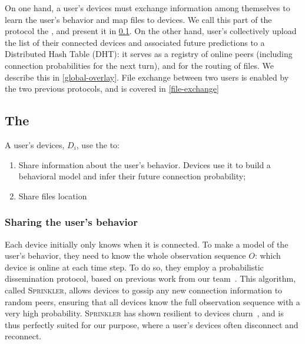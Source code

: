 On one hand, a user's devices must exchange information among themselves to learn the user's behavior  and map files to devices.
We call this part of the protocol the \localoverlay, and present it in 
\cref{local-overlay}. On the other hand, user's collectively upload the list of 
their connected devices and associated future predictions to a Distributed Hash 
Table (DHT): it serves as a registry of online peers (including connection 
probabilities for the next turn), and for the routing of files.
We describe this \globaloverlay in \cref{global-overlay}. File exchange between 
two users is enabled by the two previous protocols, and is covered in 
\cref{file-exchange}

\subsection{The \localoverlay}%
\label{local-overlay}

A user's devices, \(D_i\), use the \localoverlay to:
\begin{enumerate}
	\item Share information about the user's behavior.
	Devices use it to build a behavioral model and infer their future connection probability;
  \item Share files location 
\end{enumerate}

\subsubsection{Sharing the user's behavior}%
\label{ssub:sharing_the_user_s_behavior}

Each device initially only knows when it is connected. 
To make a model of the user's behavior, they need to know the whole observation sequence $O$: which device is online at each time step.
To do so, they employ a probabilistic dissemination protocol, based on previous work from our team~\cite{luxey:hal-01704172}.
This algorithm, called \textsc{Sprinkler}, allows devices to gossip any new connection information to random peers, ensuring that all devices know the full observation sequence with a very high probability.
\textsc{Sprinkler} has shown resilient to devices churn~\cite{luxey:cascade}, and is thus perfectly suited for our purpose, where a user's devices often disconnect and reconnect. 




